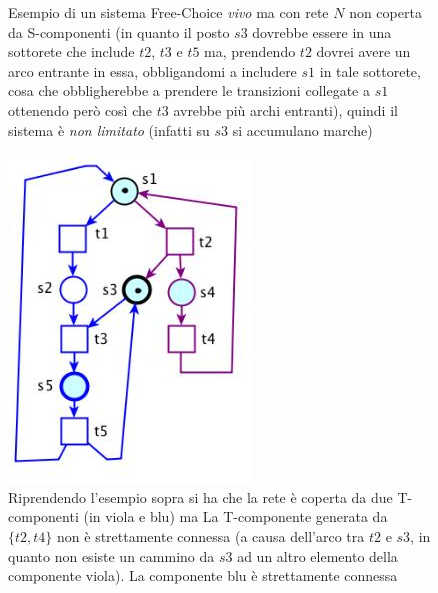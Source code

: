 \documentclass[a4paper,12pt, oneside]{book}
\begin{document}
\begin{teorema}
\begin{figure}[H]
    \caption{Esempio di un sistema Free-Choice \emph{vivo} ma con rete $N$ non
      coperta da S-componenti (in quanto il posto $s3$ dovrebbe essere in una
      sottorete che include $t2$, $t3$ e $t5$ ma, prendendo $t2$ dovrei avere un
      arco entrante in essa, obbligandomi a includere $s1$ in tale sottorete,
      cosa che obbligherebbe a prendere le transizioni collegate a $s1$
      ottenendo però così che $t3$ avrebbe più archi entranti), quindi il
      sistema è \emph{non limitato} (infatti su $s3$ si accumulano marche)}  
  \end{figure}
  \begin{figure}[H]
    \centering
    \includegraphics[scale = 0.45]{img/fc14.jpg}
    \caption{Riprendendo l'esempio sopra si ha che la rete è coperta da due
      T-componenti (in viola e blu) ma La T-componente generata da $\{t2 , t4
      \}$ non è strettamente connessa (a causa dell'arco tra $t2$ e $s3$, in
      quanto non esiste un cammino da $s3$ ad un altro elemento della
      componente viola). La componente blu è strettamente connessa}   
  \end{figure}
\end{teorema}
\end{document}
